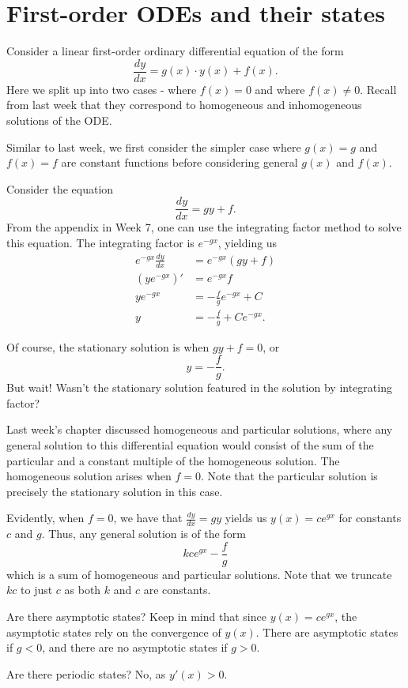 \documentclass[a4paper, 12pt,oneside,openany]{book}
\begin{document}
\section{First-order ODEs and their states}

Consider a linear first-order ordinary differential equation of the form $$\frac{dy}{dx} = g(x) \cdot y(x)+f(x).$$ Here we split up into two cases - where $f(x)=0$ and where $f(x)\neq0$. Recall from last week that they correspond to homogeneous and inhomogeneous solutions of the ODE. 

Similar to last week, we first consider the simpler case where $g(x)=g$ and $f(x)=f$ are constant functions before considering general $g(x)$ and $f(x)$.

 Consider the equation $$\frac{dy}{dx}=gy+f.$$ From the appendix in Week 7, one can use the integrating factor method to solve this equation. The integrating factor is $e^{-gx}$, yielding us \begin{align*} e^{-gx} \frac{dy}{dx} &= e^{-gx} (gy+f) \\ (ye^{-gx})' &= e^{-gx}f \\ ye^{-gx} &= -\frac{f}{g} e^{-gx}+C \\ y&= -\frac{f}{g}+Ce^{-gx}.\end{align*}

Of course, the stationary solution is when $gy+f=0$, or $$y=-\frac{f}{g}.$$ But wait! Wasn't the stationary solution featured in the solution by integrating factor?

Last week's chapter discussed homogeneous and particular solutions, where any general solution to this differential equation would consist of the sum of the particular and a constant multiple of the homogeneous solution. The homogeneous solution arises when $f=0$. Note that the particular solution is precisely the stationary solution in this case.

Evidently, when $f=0$, we have that $\frac{dy}{dx} = gy$ yields us $y(x)= ce^{gx}$ for constants $c$ and $g$. Thus, any general solution is of the form $$kce^{gx}-\frac{f}{g}$$ which is a sum of homogeneous and particular solutions. Note that we truncate $kc$ to just $c$ as both $k$ and $c$ are constants.

Are there asymptotic states? Keep in mind that since $y(x) = ce^{gx}$, the asymptotic states rely on the convergence of $y(x)$. There are asymptotic states if $g<0$, and there are no asymptotic states if $g>0$.

Are there periodic states? No, as $y'(x) >0$.
\end{document}
